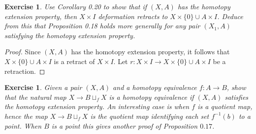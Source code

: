 \documentclass{article}
\newtheorem{exercise}[theorem]{Exercise}
\begin{document}
\begin{exercise}
Use Corollary 0.20 to show that if $(X,A)$ has the homotopy extension property, then $X\times I$ deformation retracts to $X\times\{0\}\cup A\times I$. Deduce from this that Proposition 0.18 holds more generally for any pair $(X_1,A)$ satisfying the homotopy extension property.
\end{exercise}
\begin{proof}
Since $(X,A)$ has the homotopy extension property, it follows that $X\times\{0\}\cup A\times I$ is a retract of $X\times I$. Let $r:X\times I\to X\times\{0\}\cup A\times I$ be a retraction.
\end{proof}


\begin{exercise}
Given a pair $(X,A)$ and a homotopy equivalence $f:A\to B$, show that the natural map $X\to B\sqcup_fX$ is a homotopy equivalence if $(X,A)$ satisfies the homotopy extension property. An interesting case is when $f$ is a quotient map, hence the map $X\to B\sqcup_f X$ is the quotient map identifying each set $f^{-1}(b)$ to a point. When $B$ is a point this gives another proof of Proposition $0.17$.
\end{exercise}
\end{document}
